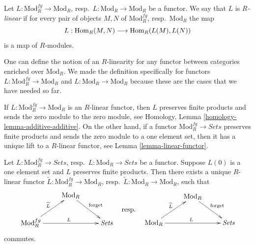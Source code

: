 \begin{definition}
\label{definition-linear}
Let $L: \text{Mod}^{fg}_R \to \text{Mod}_R$,
resp.\ $L: \text{Mod}_R \to \text{Mod}_R$
be a functor.  We say that $L$ is {\it $R$-linear} if for every
pair of objects $M, N$ of $\text{Mod}^{fg}_R$, resp.\ $\text{Mod}_R$
the map
$$
L : \mathop{\mathrm{Hom}}\nolimits_R(M, N) \longrightarrow \mathop{\mathrm{Hom}}\nolimits_R(L(M), L(N))
$$
is a map of $R$-modules.
\end{definition}

\begin{remark}
\label{remark-linear-enriched-over-modules}
One can define the notion of an $R$-linearity for any functor between
categories enriched over $\text{Mod}_R$. We made the definition
specifically for functors $L: \text{Mod}^{fg}_R \to \text{Mod}_R$ and
$L: \text{Mod}_R \to \text{Mod}_R$
because these are the cases that we have needed so far.
\end{remark}

\begin{remark}
\label{remark-linear-functor}
If $L: \text{Mod}^{fg}_R \to \text{Mod}_R$ is an $R$-linear functor,
then $L$ preserves finite products and sends the zero module to the zero
module, see
Homology, Lemma \ref{homology-lemma-additive-additive}.
On the other hand, if a functor $\text{Mod}^{fg}_R \to \textit{Sets}$
preserves finite products and sends the zero module to a one element set,
then it has a unique lift to a $R$-linear functor, see
Lemma \ref{lemma-linear-functor}.
\end{remark}

\begin{lemma}
\label{lemma-linear-functor}
Let $L: \text{Mod}^{fg}_R \to \textit{Sets}$,
resp.\ $L: \text{Mod}_R \to \textit{Sets}$ be a
functor.  Suppose $L(0)$ is a one element set and $L$ preserves finite
products.  Then there exists a unique $R$-linear functor
$\widetilde{L} : \text{Mod}^{fg}_R \to \text{Mod}_R$,
resp.\  $\widetilde{L} : \text{Mod}_R \to \text{Mod}_R$,
such that
$$
\vcenter{
\xymatrix{
& \text{Mod}_R \ar[dr]^{\text{forget}} &   \\
\text{Mod}^{fg}_R  \ar[ur]^{\widetilde{L}} \ar[rr]^{L} &  &
\textit{Sets}
}
}
\quad\text{resp.}\quad
\vcenter{
\xymatrix{
& \text{Mod}_R \ar[dr]^{\text{forget}} &   \\
\text{Mod}_R  \ar[ur]^{\widetilde{L}} \ar[rr]^{L} &  &
\textit{Sets}
}
}
$$
commutes.
\end{lemma}

